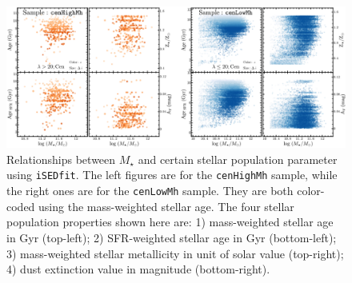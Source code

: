 \documentclass{emulateapj}
\def\rbcg{\texttt{cenHighMh}}
\def\nbcg{\texttt{cenLowMh}}
\def\mstar{{$M_{\star}$}}
\begin{document}
\begin{CJK*}{UTF8}{gbsn}
    \begin{figure}[hbt!]
        \begin{center}
        \includegraphics[width=\textwidth]{fig/redbcg_isedfit_2.pdf}
        \caption{Relationships between \mstar{} and certain stellar population 
            parameter using \texttt{iSEDfit}. 
            The left figures are for the \rbcg{} sample, while the right ones are 
            for the \nbcg{} sample. 
            They are both color-coded using the mass-weighted stellar age. 
            The four stellar population properties shown here are: 
            1) mass-weighted stellar age in Gyr (top-left); 
            2) SFR-weighted stellar age in Gyr (bottom-left); 
            3) mass-weighted stellar metallicity in unit of solar value (top-right);
            4) dust extinction value in magnitude (bottom-right).}
        \label{fig:ised_2}
        \end{center}
    \end{figure}


\end{CJK*}
\end{document}
